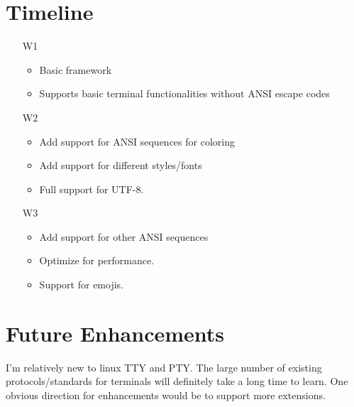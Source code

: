 \documentclass[11pt]{article}
\begin{document}
    \section{Timeline}
        \begin{enumerate}
            \item[W1]
                \begin{itemize}
                    \item Basic framework
                    \item Supports basic terminal functionalities without ANSI escape codes
                \end{itemize}
            
            \item[W2]
                \begin{itemize}
                    \item Add support for ANSI sequences for coloring
                    \item Add support for different styles/fonts
                    \item Full support for UTF-8.
                \end{itemize}
            
            \item[W3]
                \begin{itemize}
                    \item Add support for other ANSI sequences
                    \item Optimize for performance.
                    \item Support for emojis.
                \end{itemize}
        \end{enumerate}
    
    \section{Future Enhancements}
        I'm relatively new to linux TTY and PTY. The large number of existing protocols/standards for terminals will definitely take a long time to learn. One obvious direction for enhancements would be to support more extensions.
\end{document}
